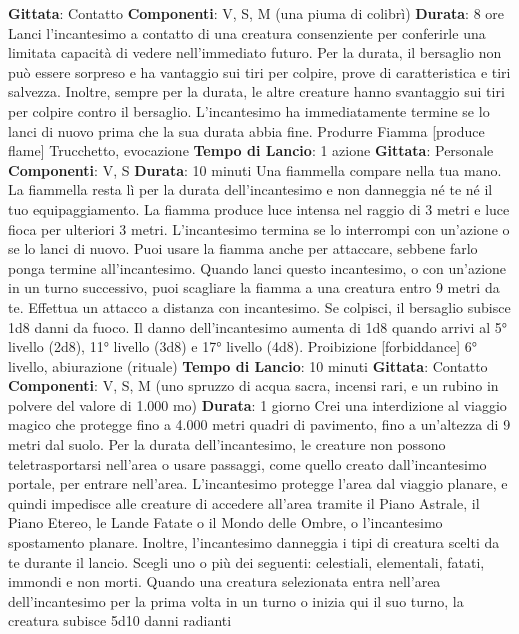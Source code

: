 \begin{multicols}{2}
\textbf{Gittata}: Contatto
\textbf{Componenti}: V, S, M (una piuma di colibrì)
\textbf{Durata}: 8 ore
Lanci l’incantesimo a contatto di una creatura
consenziente per conferirle una limitata capacità di
vedere nell’immediato futuro. Per la durata, il bersaglio
non può essere sorpreso e ha vantaggio sui tiri per
colpire, prove di caratteristica e tiri salvezza. Inoltre,
sempre per la durata, le altre creature hanno
svantaggio sui tiri per colpire contro il bersaglio.
L’incantesimo ha immediatamente termine se lo lanci di
nuovo prima che la sua durata abbia fine.
Produrre Fiamma
[produce flame]
Trucchetto, evocazione
\textbf{Tempo di Lancio}: 1 azione
\textbf{Gittata}: Personale
\textbf{Componenti}: V, S
\textbf{Durata}: 10 minuti
Una fiammella compare nella tua mano. La fiammella
resta lì per la durata dell’incantesimo e non danneggia
né te né il tuo equipaggiamento. La fiamma produce
luce intensa nel raggio di 3 metri e luce fioca per
ulteriori 3 metri. L’incantesimo termina se lo interrompi
con un’azione o se lo lanci di nuovo.
Puoi usare la fiamma anche per attaccare, sebbene
farlo ponga termine all’incantesimo. Quando lanci
questo incantesimo, o con un’azione in un turno
successivo, puoi scagliare la fiamma a una creatura
entro 9 metri da te. Effettua un attacco a distanza con
incantesimo. Se colpisci, il bersaglio subisce 1d8 danni
da fuoco.
Il danno dell’incantesimo aumenta di 1d8 quando arrivi
al 5° livello (2d8), 11° livello (3d8) e 17° livello (4d8).
Proibizione
[forbiddance]
6° livello, abiurazione (rituale)
\textbf{Tempo di Lancio}: 10 minuti
\textbf{Gittata}: Contatto
\textbf{Componenti}: V, S, M (uno spruzzo di acqua sacra,
incensi rari, e un rubino in polvere del valore di 1.000
mo)
\textbf{Durata}: 1 giorno
Crei una interdizione al viaggio magico che protegge
fino a 4.000 metri quadri di pavimento, fino a un’altezza
di 9 metri dal suolo. Per la durata dell’incantesimo, le
creature non possono teletrasportarsi nell’area o usare
passaggi, come quello creato dall’incantesimo portale,
per entrare nell’area. L’incantesimo protegge l’area dal
viaggio planare, e quindi impedisce alle creature di
accedere all’area tramite il Piano Astrale, il Piano
Etereo, le Lande Fatate o il Mondo delle Ombre, o
l’incantesimo spostamento planare.
Inoltre, l’incantesimo danneggia i tipi di creatura scelti
da te durante il lancio. Scegli uno o più dei seguenti:
celestiali, elementali, fatati, immondi e non morti.
Quando una creatura selezionata entra nell’area
dell’incantesimo per la prima volta in un turno o inizia
qui il suo turno, la creatura subisce 5d10 danni radianti

\end{multicols}
